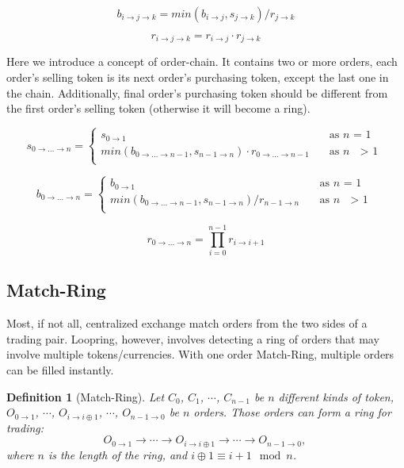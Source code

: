 \documentclass[UTF8,nofonts]{article}
\newtheorem{definition}{Definition}[section]
\begin{document}
\begin{equation}
b_{i\rightarrow j\rightarrow k}=min(b_{i\rightarrow j}, s_{j\rightarrow k}) / r_{j\rightarrow k}
\end{equation}

\begin{equation}
r_{i\rightarrow j\rightarrow k}= r_{i\rightarrow j}\cdot r_{j\rightarrow k}
\end{equation}


Here we introduce a concept of order-chain. It contains two or more orders, each order's selling token is its next order's purchasing token, except the last one in the chain. Additionally,  final order's purchasing token should be different from the first order's selling token (otherwise it will become a ring).

\[ s_{0\rightarrow ...\rightarrow n} =
 \begin{cases}
  s_{0\rightarrow 1}   & \quad \text{as } n \text{ = 1}\\
  min(b_{0\rightarrow ...\rightarrow n-1}, s_{n-1\rightarrow n}) \cdot r_{0\rightarrow ...\rightarrow n-1} & \quad \text{as\ } n \text{ $>$ 1}\\
 \end{cases}
\]

\[ b_{0\rightarrow ...\rightarrow n} =
 \begin{cases}
  b_{0\rightarrow 1}   & \quad \text{as } n \text{ = 1}\\
  min(b_{0\rightarrow ...\rightarrow n-1}, s_{n-1\rightarrow n}) / r_{n-1\rightarrow n} & \quad \text{as\ } n \text{ $>$ 1}\\
 \end{cases}
\]


\[ r_{0\rightarrow ...\rightarrow n} = \prod_{i=0}^{n-1}{r_{i\rightarrow i+1}}
\]


\subsection{Match-Ring}

Most, if not all, centralized exchange match orders from the two sides of a trading pair. Loopring, however, involves detecting a ring of orders that may involve multiple tokens/currencies. With one order Match-Ring, multiple orders can be filled instantly.

\begin{definition}[Match-Ring] Let $C_{0}$, $C_{1}$, $\cdots$, $C_{n-1}$ be $n$ different kinds of token, $O_{0\rightarrow 1}$, $\cdots$, $O_{i\rightarrow i\oplus 1}$, $\cdots$, $O_{n-1 \rightarrow 0}$ be $n$ orders. Those orders can form a ring for trading:
$$O_{0\rightarrow 1} \rightarrow \cdots \rightarrow O_{i\rightarrow i\oplus 1} \rightarrow \cdots \rightarrow O_{n-1\rightarrow 0} \text{, }$$
where $n$ is the length of the ring, and $i\oplus 1 \equiv i+1 \mod n$.
\end{definition}
\end{document}
